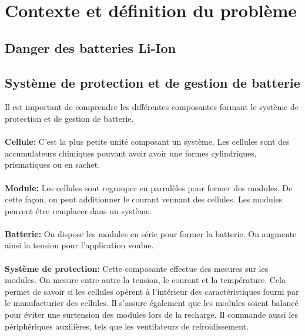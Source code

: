 \section{Contexte et définition du problème}


	\subsection{Danger des batteries Li-Ion}
	
		\subsection{Système de protection et de gestion de batterie}
		
		
		Il est important de comprendre les différentes composantes formant le système de protection et de gestion de batterie.
		
			\paragraph{}
			\textbf{Cellule:} C'est la plus petite unité composant un système. Les cellules sont des accumulateurs chimiques pouvant avoir avoir une formes cylindriques, prismatiques ou en sachet.  
			
			\paragraph{}
			\textbf{Module:} Les cellules sont regrouper en parralèles pour former des modules. De cette façon, on peut additionner le courant vennant des cellules. Les modules peuvent être remplacer dans un système.
			
			\paragraph{}
			\textbf{Batterie:} On dispose les modules en série pour former la batterie. On augmente ainsi la tension pour l'application voulue.
			
			\paragraph{}
			\textbf{Système de protection:} Cette composante effectue des mesures sur les modules. On mesure entre autre la tension, le courant et la température. Cela permet de savoir si les cellules opèrent à l'intérieur des caractéristiques fourni par le manufacturier des cellules. Il s'assure également que les modules soient balancé pour éviter une surtension des modules lors de la recharge. Il commande aussi les périphériques auxilières, tels que les ventilateurs de refroidissement.
			
